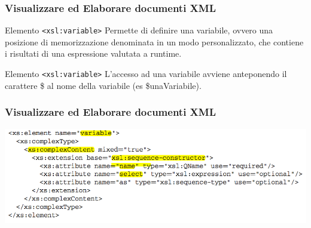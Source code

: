 
\begin{frame}
    \frametitle{Visualizzare ed Elaborare documenti XML}
    \addtocounter{nframe}{1}
    

     \begin{block}{Elemento \texttt{<xsl:variable>}}
        Permette di definire una variabile, ovvero una posizione di memorizzazione denominata in un modo personalizzato, che contiene i risultati di una espressione valutata a runtime.
     \end{block}

     \begin{block}{Elemento \texttt{<xsl:variable>}}
        L’accesso ad una variabile avviene anteponendo il carattere \$ al nome della variabile (es \$unaVariabile).
     \end{block}

\end{frame}

\begin{frame}
    \frametitle{Visualizzare ed Elaborare documenti XML}
    \addtocounter{nframe}{1}
    
    \begin{center}
        \includegraphics[width=.95\textwidth]{imgs/Schema-variable.png}
    \end{center}

\end{frame}

